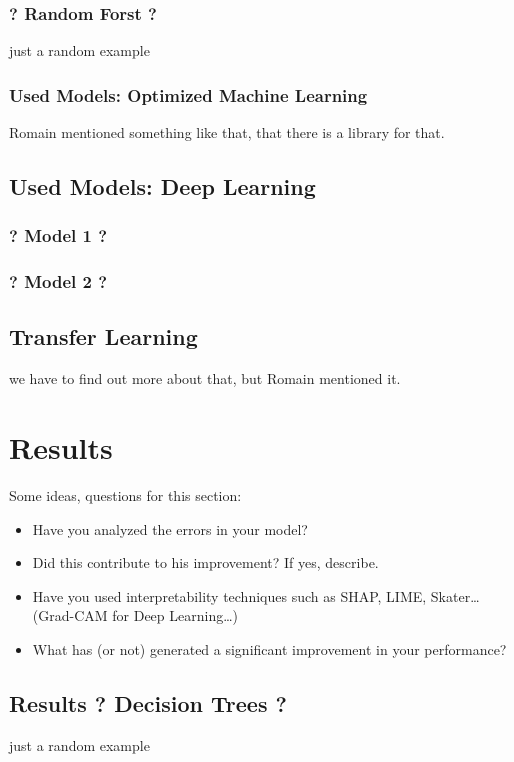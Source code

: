 \documentclass{article}
\begin{document}
\subsubsection{? Random Forst ?}
just a random example

\subsubsection{Used Models: Optimized Machine Learning}
Romain mentioned something like that, that there is a library for that.

\subsection{Used Models: Deep Learning}

\subsubsection{? Model 1 ?}
\subsubsection{? Model 2 ?}

\subsection{Transfer Learning}
we have to find out more about that, but Romain mentioned it.

\section{Results}
Some ideas, questions for this section:

\begin{itemize}
    \item Have you analyzed the errors in your model?
    \item Did this contribute to his improvement? If yes, describe.
    \item Have you used interpretability techniques such as SHAP, LIME, Skater… (Grad-CAM for Deep Learning…)
    \item What has (or not) generated a significant improvement in your performance?
\end{itemize}



\subsection{Results ? Decision Trees ?}
just a random example
\end{document}
